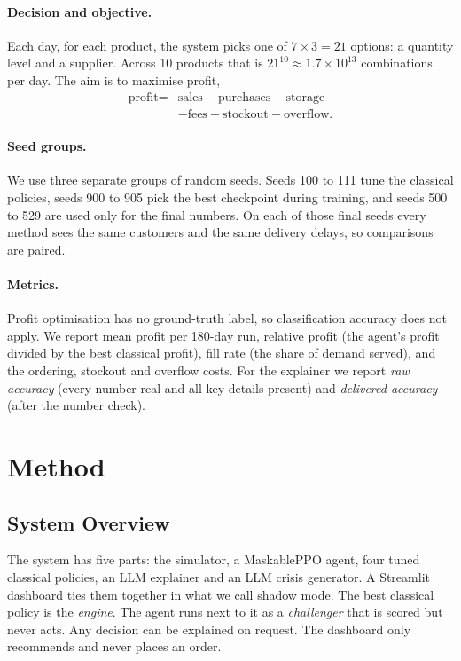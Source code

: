 \documentclass[10pt,twocolumn]{article}
\begin{document}
\paragraph{Decision and objective.}
Each day, for each product, the system picks one of $7\times3=21$ options:
a quantity level and a supplier. Across 10 products that is
$21^{10}\approx1.7\times10^{13}$ combinations per day. The aim is to maximise
profit,
\begin{equation}\begin{split}
\text{profit}={}&\text{sales}-\text{purchases}-\text{storage}\\
&-\text{fees}-\text{stockout}-\text{overflow}.
\end{split}\end{equation}

\paragraph{Seed groups.}
We use three separate groups of random seeds. Seeds 100 to 111 tune the
classical policies, seeds 900 to 905 pick the best checkpoint during training,
and seeds 500 to 529 are used only for the final numbers. On each of those
final seeds every method sees the same customers and the same delivery delays,
so comparisons are paired.

\paragraph{Metrics.}
Profit optimisation has no ground-truth label, so classification accuracy does
not apply. We report mean profit per 180-day run, relative profit (the agent's
profit divided by the best classical profit), fill rate (the share of demand
served), and the ordering, stockout and overflow costs. For the explainer we
report \emph{raw accuracy} (every number real and all key details present) and
\emph{delivered accuracy} (after the number check).

\section{Method}

\subsection{System Overview}

The system has five parts: the simulator, a MaskablePPO agent, four tuned
classical policies, an LLM explainer and an LLM crisis generator. A Streamlit
dashboard ties them together in what we call shadow mode. The best classical
policy is the \emph{engine}. The agent runs next to it as a \emph{challenger}
that is scored but never acts. Any decision can be explained on request. The
dashboard only recommends and never places an order.
\end{document}
